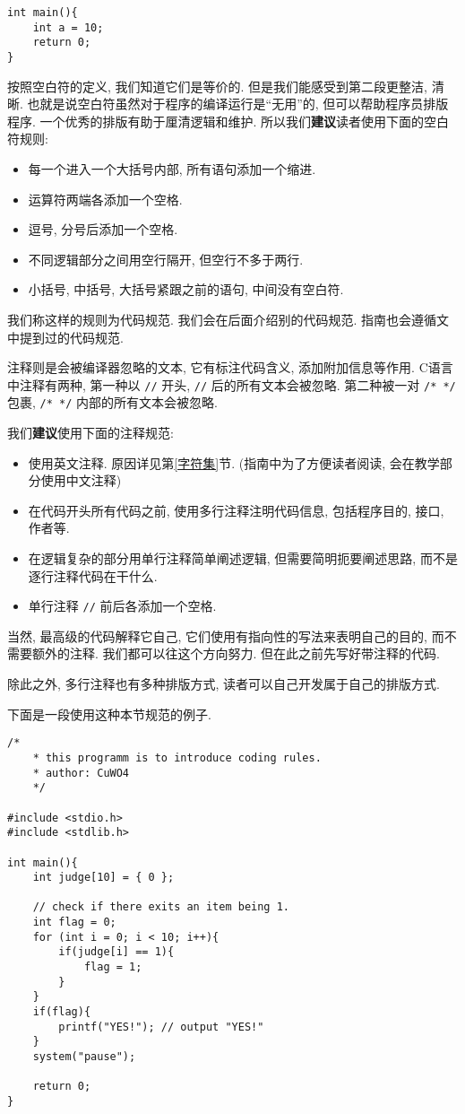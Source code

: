 \begin{lstlisting}
int main(){
    int a = 10;
    return 0;
}
\end{lstlisting}

        按照空白符的定义, 我们知道它们是等价的. 但是我们能感受到第二段更整洁, 清晰. 也就是说空白符虽然对于程序的编译运行是``无用''的, 但可以帮助程序员排版程序. 一个优秀的排版有助于厘清逻辑和维护. 所以我们\textbf{建议}读者使用下面的空白符规则:
        \begin{itemize}
            \item 每一个进入一个大括号内部, 所有语句添加一个缩进.
            \item 运算符两端各添加一个空格.
            \item 逗号, 分号后添加一个空格.
            \item 不同逻辑部分之间用空行隔开, 但空行不多于两行.
            \item 小括号, 中括号, 大括号紧跟之前的语句, 中间没有空白符.
        \end{itemize}

        我们称这样的规则为代码规范. 我们会在后面介绍别的代码规范. 指南也会遵循文中提到过的代码规范.

        注释则是会被编译器忽略的文本, 它有标注代码含义, 添加附加信息等作用. C语言中注释有两种, 第一种以 \texttt{//} 开头, \texttt{//} 后的所有文本会被忽略. 第二种被一对 \texttt{/* */} 包裹, \texttt{/* */} 内部的所有文本会被忽略.

        我们\textbf{建议}使用下面的注释规范:
        \begin{itemize}
            \item 使用英文注释. 原因详见第\ref{字符集}节. (指南中为了方便读者阅读, 会在教学部分使用中文注释)
            \item 在代码开头所有代码之前, 使用多行注释注明代码信息, 包括程序目的, 接口, 作者等.
            \item 在逻辑复杂的部分用单行注释简单阐述逻辑, 但需要简明扼要阐述思路, 而不是逐行注释代码在干什么.
            \item 单行注释 \texttt{//} 前后各添加一个空格.
        \end{itemize}

        当然, 最高级的代码解释它自己, 它们使用有指向性的写法来表明自己的目的, 而不需要额外的注释. 我们都可以往这个方向努力. 但在此之前先写好带注释的代码.

        除此之外, 多行注释也有多种排版方式, 读者可以自己开发属于自己的排版方式.

        下面是一段使用这种本节规范的例子.
\begin{lstlisting}
/*
    * this programm is to introduce coding rules.
    * author: CuWO4
    */

#include <stdio.h>
#include <stdlib.h>

int main(){
    int judge[10] = { 0 };

    // check if there exits an item being 1.
    int flag = 0;
    for (int i = 0; i < 10; i++){
        if(judge[i] == 1){
            flag = 1;
        }
    }
    if(flag){
        printf("YES!"); // output "YES!"
    }
    system("pause");

    return 0;
}
\end{lstlisting}

